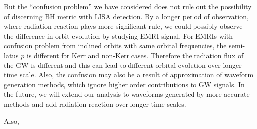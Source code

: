 \documentclass{article}
\begin{document}
But the ``confusion problem'' we have considered does not rule out the possibility of discerning BH metric with LISA detection. By a longer period of observation, where radiation reaction plays more significant rule, we could possibly observe the difference in orbit evolution by studying EMRI signal. For EMRIs with confusion problem from inclined orbits with same orbital frequencies, the semi-latus $p$ is different for Kerr and non-Kerr cases. Therefore the radiation flux of the GW is different and this can lead to different orbital evolution over longer time scale. Also, the confusion may also be a result of approximation of waveform generation methods, which ignore higher order contributions to GW signals. In the future, we will extend our analysis to waveforms generated by more accurate methods and add radiation reaction over longer time scales. 

Also, 




\end{document}

